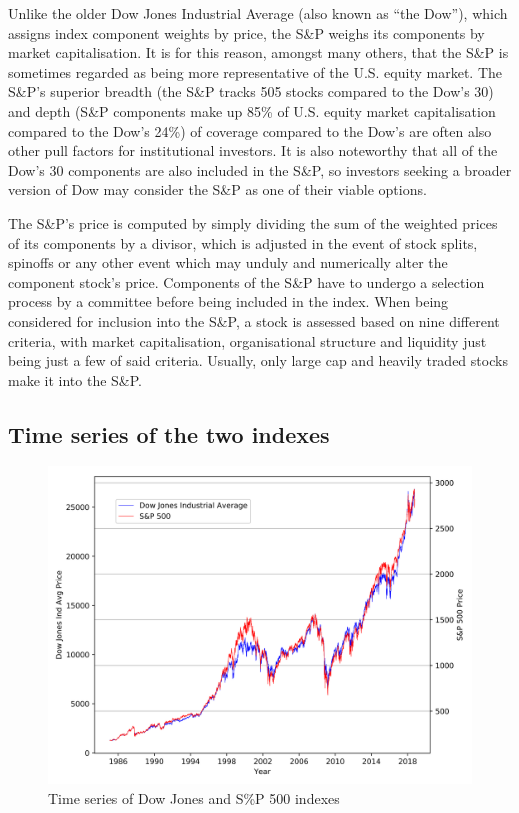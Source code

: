 \documentclass[a4paper]{article}
\begin{document}
	Unlike the older Dow Jones Industrial Average (also known as “the Dow”), which assigns index component weights by price, the S\&P weighs its components by market capitalisation. It is for this reason, amongst many others, that the S\&P is sometimes regarded as being more representative of the U.S. equity market. The S\&P’s superior breadth (the S\&P tracks 505 stocks compared to the Dow’s 30) and depth (S\&P components make up 85\% of U.S. equity market capitalisation compared to the Dow’s 24\%) of coverage compared to the Dow’s are often also other pull factors for institutional investors. It is also noteworthy that all of the Dow’s 30 components are also included in the S\&P, so investors seeking a broader version of Dow may consider the S\&P as one of their viable options.
	
	The S\&P’s price is computed by simply dividing the sum of the weighted prices of its components by a divisor, which is adjusted in the event of stock splits, spinoffs or any other event which may unduly and numerically alter the component stock’s price. Components of the S\&P have to undergo a selection process by a committee before being included in the index.  When being considered for inclusion into the S\&P, a stock is assessed based on nine different criteria, with market capitalisation, organisational structure and liquidity just being just a few of said criteria. Usually, only large cap and heavily traded stocks make it into the S\&P.
	
	\subsection{Time series of the two indexes}
	
	\begin{figure}[h]
		\centering
		\includegraphics[width=0.8\linewidth]{time_series.png}
		\caption{Time series of Dow Jones and S\%P 500 indexes}
	\end{figure}
	
\end{document}
